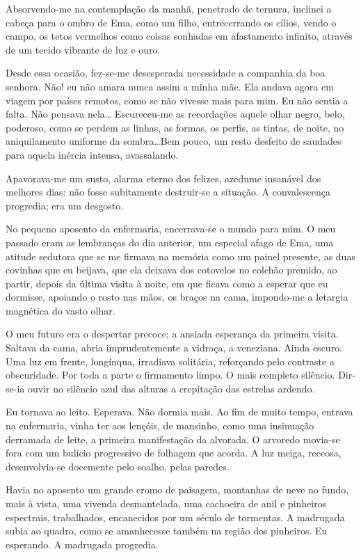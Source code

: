 Absorvendo{}-me na contemplação da manhã,
penetrado de ternura, inclinei a cabeça para o ombro de Ema, como um
filho, entrecerrando os cílios, vendo o campo, os tetos vermelhos como
coisas sonhadas em afastamento infinito, através de um tecido vibrante
de luz e ouro. 

Desde essa ocasião, fez{}-se{}-me desesperada
necessidade a companhia da boa senhora. Não! eu não amara nunca assim a
minha mãe. Ela andava agora em viagem por países remotos, como se não
vivesse mais para mim. Eu não sentia a falta. Não pensava nela\ldots
Escureceu{}-me as recordações aquele olhar negro, belo, poderoso, como
se perdem as linhas, as formas, os perfis, as tintas, de noite, no
aniquilamento uniforme da sombra\ldots Bem pouco, um resto desfeito de
saudades para aquela inércia intensa, avassalando. 

Apavorava{}-me um
susto, alarma eterno dos felizes, azedume insanável dos melhores dias:
não fosse subitamente destruir{}-se a situação. A convalescença
progredia; era um desgosto. 

No pequeno aposento da enfermaria,
encerrava{}-se o mundo para mim. O meu passado eram as lembranças do
dia anterior, um especial afago de Ema, uma atitude sedutora que se me
firmava na memória como um painel presente, as duas covinhas que eu
beijava, que ela deixava dos cotovelos no colchão premido, ao partir,
depois da última visita à noite, em que ficava como a esperar que eu
dormisse, apoiando o rosto nas mãos, os braços na cama, impondo{}-me a
letargia magnética do vasto olhar. 

O meu futuro era o despertar
precoce; a ansiada esperança da primeira visita. Saltava da cama, abria
imprudentemente a vidraça, a veneziana. Ainda escuro. Uma luz em
frente, longínqua, irradiava solitária, reforçando pelo contraste a
obscuridade. Por toda a parte o firmamento limpo. O mais completo
silêncio. Dir{}-se{}-ia ouvir no silêncio azul das alturas a crepitação
das estrelas ardendo. 

Eu tornava ao leito. Esperava. Não dormia mais.
Ao fim de muito tempo, entrava na enfermaria, vinha ter aos lençóis, de
mansinho, como uma insinuação derramada de leite, a primeira
manifestação da alvorada. O arvoredo movia{}-se fora com um bulício
progressivo de folhagem que acorda. A luz meiga, receosa,
desenvolvia{}-se docemente pelo soalho, pelas paredes. 

Havia no aposento um grande cromo de paisagem, montanhas de neve no fundo, mais
à vista, uma vivenda desmantelada, uma cachoeira de anil e pinheiros
espectrais, trabalhados, encanecidos por um século de tormentas. A
madrugada subia ao quadro, como se amanhecesse também na região dos
pinheiros. Eu esperando. A madrugada progredia. 


